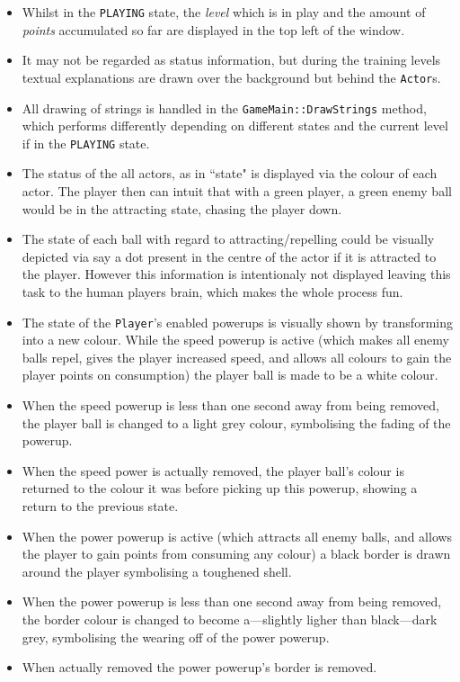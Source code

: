 \begin{itemize}
	\item Whilst in the \verb!PLAYING! state, the \emph{level} which is in play and the amount of \emph{points} accumulated so far are displayed in the top left of the window.
	\item It may not be regarded as status information, but during the training levels textual explanations are drawn over the background but behind the \verb!Actor!s.
	\item All drawing of strings is handled in the \verb!GameMain::DrawStrings! method, which performs differently depending on different states and the current level if in the \verb!PLAYING! state.
	\item The status of the all actors, as in ``state" is displayed via the colour of each actor. The player then can intuit that with a green player, a green enemy ball would be in the attracting state, chasing the player down.
	\item The state of each ball with regard to attracting/repelling could be visually depicted via say a dot present in the centre of the actor if it is attracted to the player. However this information is intentionaly not displayed leaving this task to the human players brain, which makes the whole process fun.
	\item The state of the \verb!Player!'s enabled powerups is visually shown by transforming into a new colour. While the speed powerup is active (which makes all enemy balls repel, gives the player increased speed, and allows all colours to gain the player points on consumption) the player ball is made to be a white colour.
	\item When the speed powerup is less than one second away from being removed, the player ball is changed to a light grey colour, symbolising the fading of the powerup.
	\item When the speed power is actually removed, the player ball's colour is returned to the colour it was before picking up this powerup, showing a return to the previous state.
	\item When the power powerup is active (which attracts all enemy balls, and allows the player to gain points from consuming any colour) a black border is drawn around the player symbolising a toughened shell.
	\item When the power powerup is less than one second away from being removed, the border colour is changed to become a---slightly ligher than black---dark grey, symbolising the wearing off of the power powerup.
	\item When actually removed the power powerup's border is removed.
\end{itemize}

